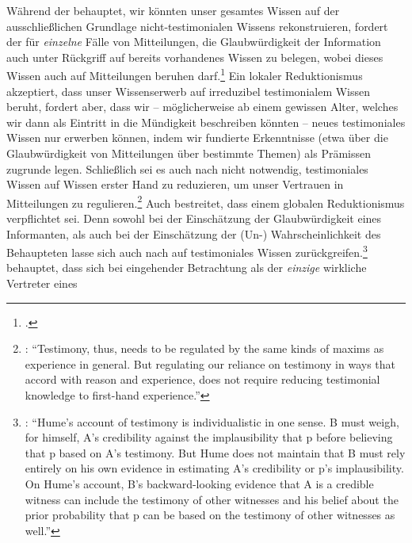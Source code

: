 Während der  behauptet, wir
könnten unser gesamtes Wissen auf der ausschließlichen Grundlage
nicht-testimonialen Wissens rekonstruieren, fordert der  für \emph{einzelne} Fälle von Mitteilungen, die
Glaubwürdigkeit der Information auch unter Rückgriff auf bereits vorhandenes
Wissen zu belegen, wobei dieses Wissen auch auf Mitteilungen beruhen
darf.\footnote{\cite[Vgl. hierzu][]{Fricker:AgainstGullibility1994}.} Ein
lokaler Reduktionismus akzeptiert, dass unser Wissenserwerb auf irreduzibel testimonialem Wissen
beruht, fordert aber, dass wir -- möglicherweise ab einem gewissen Alter,
welches wir dann als Eintritt in die Mündigkeit beschreiben könnten -- neues
testimoniales Wissen nur erwerben können, indem wir fundierte Erkenntnisse (etwa über die Glaubwürdigkeit von Mitteilungen über bestimmte Themen) als Prämissen zugrunde legen. Schließlich
sei es auch nach  nicht notwendig, testimoniales Wissen auf Wissen
erster Hand zu reduzieren, um unser Vertrauen in Mitteilungen zu
regulieren.\footnote{\cite[Vgl.][73]{Gelfert:HumeonTestimonyRevisited2010}:
\enquote{Testimony, thus, needs to be regulated by the same kinds of maxims as
experience in general. But regulating our reliance on testimony in ways that
accord with reason and experience, does not require reducing testimonial
knowledge to first-hand experience.}} Auch 
bestreitet, dass  einem globalen Reduktionismus verpflichtet sei. Denn sowohl bei der
Einschätzung der Glaubwürdigkeit eines Informanten, als auch bei der
Einschätzung der \mbox{(Un-)} Wahrscheinlichkeit des Behaupteten lasse sich auch
nach  auf testimoniales Wissen
zurückgreifen.\footnote{\cite[Vgl.][30]{Root:HumeontheVirtuesofTestimony2001}:
\enquote{Hume’s account of testimony is individualistic in one sense. B must
weigh, for himself, A’s credibility against the implausibility that p before
believing that p based on A’s testimony. But Hume does not maintain that B must
rely entirely on his own evidence in estimating A’s credibility or p’s
implausibility. On Hume’s account, B’s backward-looking evidence that A is a
credible witness can include the testimony of other witnesses and his belief
about the prior probability that p can be based on the testimony of other
witnesses as well.}}  behauptet, dass sich
 bei eingehender Betrachtung als der \emph{einzige} wirkliche Vertreter eines
